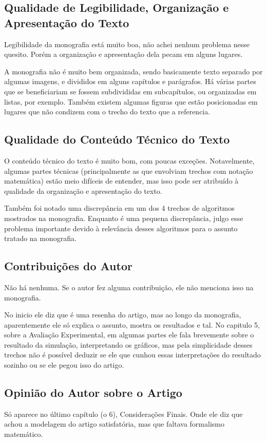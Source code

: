 \subsection{Qualidade de Legibilidade, Organização e Apresentação do Texto}
Legibilidade da monografia está muito boa, não achei nenhum problema nesse quesito. Porém
a organização e apresentação dela pecam em alguns lugares.

A monografia não é muito bem organizada, sendo basicamente texto separado por algumas imagens,
e divididos em alguns capítulos e parágrafos. Há várias partes que se beneficiariam se fossem subdivididas
em subcapítulos, ou organizadas em listas, por exemplo. Também existem algumas figuras que estão
posicionadas em lugares que não condizem com o trecho do texto que a referencia.

\subsection{Qualidade do Conteúdo Técnico do Texto}
O conteúdo técnico do texto é muito bom, com poucas exceções. Notavelmente, algumas partes técnicas
(principalmente as que envolviam trechos com notação matemática) estão meio difíceis de entender,
mas isso pode ser atribuído à qualidade da organização e apresentação do texto.

Também foi notado uma discrepância em um dos 4 trechos de algoritmos mostrados na monografia. Enquanto
é uma pequena discrepância, julgo esse problema importante devido à relevância desses algoritmos para
o assunto tratado na monografia.

\subsection{Contribuições do Autor}
Não há nenhuma. Se o autor fez alguma contribuição, ele não menciona isso na monografia.

No inicio ele diz que é uma resenha do artigo, mas ao longo da monografia, 
aparentemente ele só explica o assunto, mostra os resultados e tal. No capitulo 5,
sobre a Avaliação Experimental, em algumas partes ele fala brevemente sobre o resultado da simulação,
interpretando os gráficos, mas pela simplicidade desses trechos não é possível deduzir se ele
que cunhou essas interpretações do resultado sozinho ou se ele pegou isso do artigo.

\subsection{Opinião do Autor sobre o Artigo}
Só aparece no último capítulo (o 6), Considerações Finais. Onde ele diz que achou a modelagem
do artigo satisfatória, mas que faltava formalismo matemático.

